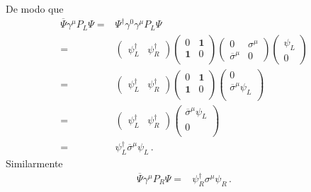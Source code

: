 \begin{frame}
De modo que
\begin{align}
  \overline{\Psi}\gamma^{\mu}P_{L}\Psi=&\Psi^{\dagger}\gamma^0\gamma^{\mu}P_L \Psi \nonumber\\
=&  \begin{pmatrix}
     \psi_L^{\dagger} & \psi_R^{\dagger}  
  \end{pmatrix}
  \begin{pmatrix}
    0 & \mathbf{1} \\
    \mathbf{1} & 0 \\
  \end{pmatrix}
  \begin{pmatrix}
   0 & \sigma^{\mu}\\
   \overline{\sigma}^{\mu} & 0     
  \end{pmatrix}
  \begin{pmatrix}
   \psi_L\\
     0      
  \end{pmatrix}\nonumber\\
=&  \begin{pmatrix}
     \psi_L^{\dagger} & \psi_R^{\dagger}  
  \end{pmatrix}
  \begin{pmatrix}
    0 & \mathbf{1} \\
    \mathbf{1} & 0 \\
  \end{pmatrix}
  \begin{pmatrix}
     0\\
   \overline{\sigma}^{\mu}\psi_L\\
  \end{pmatrix}\nonumber\\
=&  \begin{pmatrix}
     \psi_L^{\dagger} & \psi_R^{\dagger}  
  \end{pmatrix}
  \begin{pmatrix}
   \overline{\sigma}^{\mu}\psi_L\\
     0\\
  \end{pmatrix}\nonumber\\
=&   \psi_L^{\dagger} \overline{\sigma}^{\mu}\psi_L\,.
\end{align}
Similarmente
\begin{align}
\overline{\Psi}\gamma^{\mu}P_{R}\Psi=&   \psi_R^{\dagger} {\sigma}^{\mu}\psi_R\,.
\end{align}




\end{frame}
